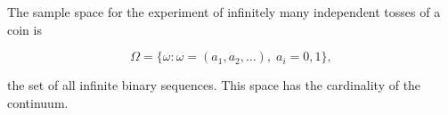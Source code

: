 The sample space for the experiment of infinitely many independent tosses of a coin is

$$\Omega = \{\omega : \omega = (a_1, a_2, \ldots), \; a_i = 0, 1\},$$

the set of all infinite binary sequences. This space has the cardinality of the continuum.

